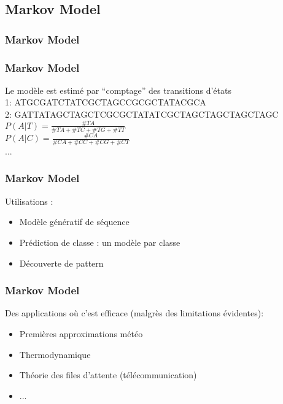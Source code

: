 \subsection{Markov Model}

\begin{frame}
  \frametitle{Markov Model}
\end{frame}

\begin{frame}
  \frametitle{Markov Model}
  Le modèle est estimé par ``comptage'' des transitions d'états \\
  1: ATGCGATCTATCGCTAGCCGCGCTATACGCA \\
  2: GATTATAGCTAGCTCGCGCTATATCGCTAGCTAGCTAGCTAGC \\
  $P(A|T) = \frac{\#TA}{\#TA+\#TC+\#TG+\#TT}$ \\
  $P(A|C) = \frac{\#CA}{\#CA+\#CC+\#CG+\#CT}$ \\
  ...
\end{frame}

\begin{frame}
  \frametitle{Markov Model}
  Utilisations :
  \begin{itemize}
  \item Modèle génératif de séquence
  \item Prédiction de classe : un modèle par classe
  \item Découverte de pattern
  \end{itemize}
\end{frame}

\begin{frame}
  \frametitle{Markov Model}
  Des applications où c'est efficace (malgrès des limitations évidentes):
  \begin{itemize}
  \item Premières approximations météo
  \item Thermodynamique
  \item Théorie des files d'attente (télécommunication)
  \item ...
  \end{itemize}
\end{frame}
